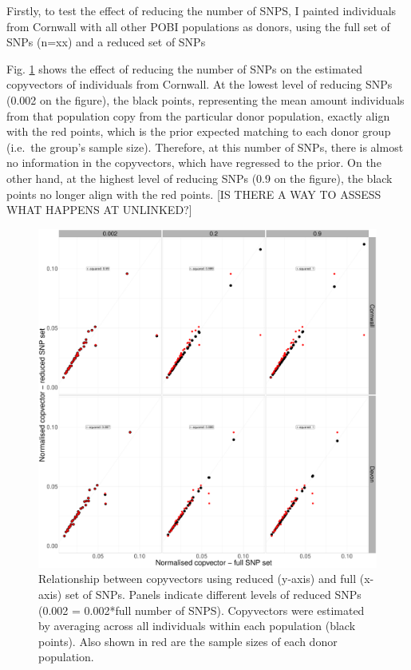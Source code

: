 Firstly, to test the effect of reducing the number of SNPS, I painted individuals from Cornwall with all other POBI populations as donors, using the full set of SNPs (n=xx) and a reduced set of SNPs 

Fig. \ref{fig:Devon_Cornwall_copyvectors_sample_size_reduced} shows the effect of reducing the number of SNPs on the estimated copyvectors of individuals from Cornwall. At the lowest level of reducing SNPs (0.002 on the figure), the black points, representing the mean amount individuals from that population copy from the particular donor population, exactly align with the red points, which is the prior expected matching to each donor group (i.e.\ the group's sample size). Therefore, at this number of SNPs, there is almost no information in the copyvectors, which have regressed to the prior. On the other hand, at the highest level of reducing SNPs (0.9 on the figure), the black points no longer align with the red points. {\color{red}[IS THERE A WAY TO ASSESS WHAT HAPPENS AT UNLINKED?]}

\begin{figure}[htp]
    \centering
    \includegraphics[width=1.0\textwidth]{../images/chapter1/Devon_Cornwall_copyvectors_sample_size_reduced.pdf}
    \caption{Relationship between copyvectors using reduced (y-axis) and full (x-axis) set of SNPs. Panels indicate different levels of reduced SNPs (0.002 = 0.002*full number of SNPS). Copyvectors were estimated by averaging across all individuals within each population (black points). Also shown in red are the sample sizes of each donor population.}
    \label{fig:Devon_Cornwall_copyvectors_sample_size_reduced}
\end{figure}

